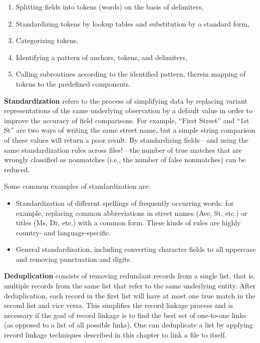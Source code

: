 \documentclass[]{krantz}
\begin{document}
\begin{enumerate}
\def\labelenumi{\arabic{enumi}.}
\item
  Splitting fields into tokens (words) on the basis of delimiters,
\item
  Standardizing tokens by lookup tables and substitution by a standard
  form,
\item
  Categorizing tokens,
\item
  Identifying a pattern of anchors, tokens, and delimiters,
\item
  Calling subroutines according to the identified pattern, therein
  mapping of tokens to the predefined components.
\end{enumerate}

\textbf{Standardization} refers to the process of simplifying data by
replacing variant representations of the same underlying observation by
a default value in order to improve the accuracy of field comparisons.
For example, ``First Street'' and ``1st St'' are two ways of writing the
same street name, but a simple string comparison of these values will
return a poor result. By standardizing fields---and using the same
standardization rules across files!---the number of true matches that
are wrongly classified as nonmatches (i.e., the number of false
nonmatches) can be reduced.

Some common examples of standardization are:

\begin{itemize}
\item
  Standardization of different spellings of frequently occurring words:
  for example, replacing common abbreviations in street names (Ave, St,
  etc.) or titles (Ms, Dr, etc.) with a common form. These kinds of
  rules are highly country- and language-specific.
\item
  General standardization, including converting character fields to all
  uppercase and removing punctuation and digits.
\end{itemize}

\textbf{Deduplication} consists of removing redundant records from a
single list, that is, multiple records from the same list that refer to
the same underlying entity. After deduplication, each record in the
first list will have at most one true match in the second list and vice
versa. This simplifies the record linkage process and is necessary if
the goal of record linkage is to find the best set of one-to-one links
(as opposed to a list of all possible links). One can deduplicate a list
by applying record linkage techniques described in this chapter to link
a file to itself.
\end{document}

